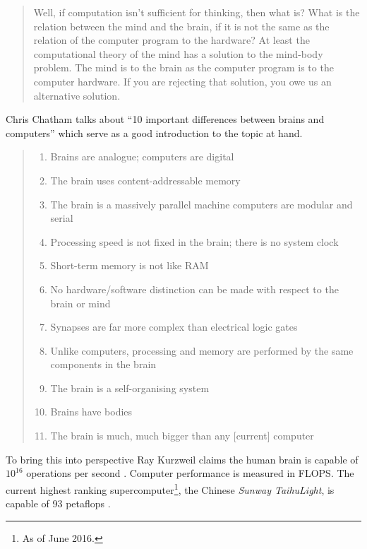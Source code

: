 \begin{quotation}
  Well, if computation isn’t sufficient for thinking, then what is? What is the relation between the mind and the brain, if it is not the same as the relation of the computer program to the hardware? At least the computational theory of the mind has a solution to the mind-body problem. The mind is to the brain as the computer program is to the computer hardware. If you are rejecting that solution, you owe us an alternative solution.
\end{quotation}

Chris Chatham talks about ``10 important differences between brains and computers'' \citeyear{Chatham2007} which serve as a good introduction to the topic at hand.

\begin{quotation}
  \begin{enumerate}
    \item Brains are analogue; computers are digital
    \item The brain uses content-addressable memory
    \item The brain is a massively parallel machine computers are modular and serial
    \item Processing speed is not fixed in the brain; there is no system clock
    \item Short-term memory is not like RAM
    \item No hardware/software distinction can be made with respect to the brain or mind
    \item Synapses are far more complex than electrical logic gates
    \item Unlike computers, processing and memory are performed by the same components in the brain
    \item The brain is a self-organising system
    \item Brains have bodies
    \item	The brain is much, much bigger than any [current] computer
  \end{enumerate}
\end{quotation}

To bring this into perspective Ray Kurzweil claims the human brain is capable of $10^{16}$ operations per second \citeyear{Kurzweil2013}. Computer performance is measured in \ac{FLOPS}. The current highest ranking supercomputer\footnote{As of June 2016.}, the Chinese \textit{Sunway TaihuLight}, is capable of 93 petaflops \autocite{Fu2016,Top2016}.

